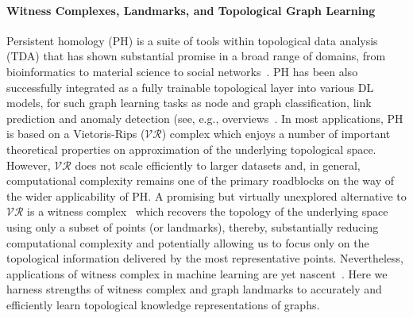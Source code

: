 \documentclass[letterpaper]{article} %
\begin{document}
\paragraph{Witness Complexes, Landmarks, and Topological Graph Learning}
Persistent homology (PH) is a suite of tools within topological data analysis (TDA) that has shown substantial promise in a broad range of domains, from bioinformatics to material science to social networks~\cite{otter2017roadmap,carlsson2020topological}. PH has been also successfully integrated as a fully trainable topological layer into various DL models, for such graph learning tasks as node and graph classification, %
link prediction %
and anomaly detection 
(see, e.g., overviews~\citet{carlsson2020topological,tauzin2021giotto}.
In most applications, PH is based on a Vietoris-Rips ($\mathcal{VR}$) complex which enjoys a number of important theoretical properties on approximation of the underlying topological space. However, $\mathcal{VR}$ does not scale efficiently to larger datasets and, in general, computational complexity remains one of the primary roadblocks on the way of the wider applicability of PH. A promising but virtually unexplored  alternative to $\mathcal{VR}$ is a witness complex~\cite{de2004topological} which recovers the topology of the underlying space using only a subset of points (or landmarks), thereby, substantially reducing computational complexity and potentially allowing us to focus only on the topological information delivered by the most representative points. Nevertheless, applications of witness complex in machine learning are yet nascent~\cite{schonenberger2020witness, poklukar2021geomca}. Here we harness strengths of witness complex and graph landmarks to accurately and efficiently learn topological knowledge representations of graphs.
\end{document}
